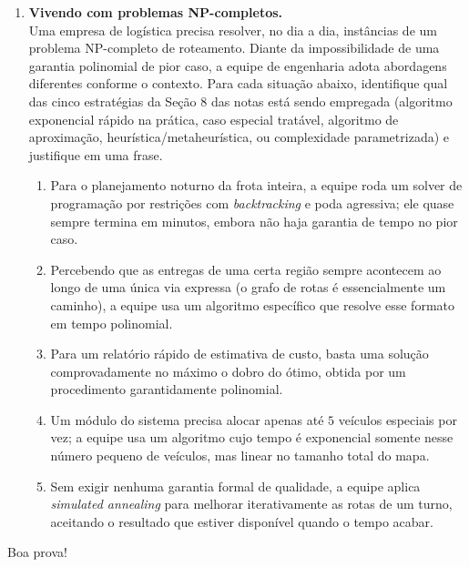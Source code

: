 \documentclass[10pt,a4paper]{extarticle}
\newcommand{\ntc}[1]{\textcolor{notice}{#1}}
\begin{document}
\begin{enumerate}[label=\textbf{\arabic*.}, itemsep=0.7cm, leftmargin=*]
\item \textbf{Vivendo com problemas NP-completos.} \\
Uma empresa de logística precisa resolver, no dia a dia, instâncias de um problema NP-completo de roteamento. Diante da impossibilidade de uma garantia polinomial de pior caso, a equipe de engenharia adota abordagens diferentes conforme o contexto. Para cada situação abaixo, identifique qual das cinco estratégias da Seção 8 das notas está sendo empregada (algoritmo exponencial rápido na prática, caso especial tratável, algoritmo de aproximação, heurística/metaheurística, ou complexidade parametrizada) e justifique em uma frase.

\begin{enumerate}[label=(\alph*)]
    \item Para o planejamento noturno da frota inteira, a equipe roda um solver de programação por restrições com \textit{backtracking} e poda agressiva; ele quase sempre termina em minutos, embora não haja garantia de tempo no pior caso.
    \item Percebendo que as entregas de uma certa região sempre acontecem ao longo de uma única via expressa (o grafo de rotas é essencialmente um caminho), a equipe usa um algoritmo específico que resolve esse formato em tempo polinomial.
    \item Para um relatório rápido de estimativa de custo, basta uma solução comprovadamente no máximo o dobro do ótimo, obtida por um procedimento garantidamente polinomial.
    \item Um módulo do sistema precisa alocar apenas até $5$ veículos especiais por vez; a equipe usa um algoritmo cujo tempo é exponencial somente nesse número pequeno de veículos, mas linear no tamanho total do mapa.
    \item Sem exigir nenhuma garantia formal de qualidade, a equipe aplica \textit{simulated annealing} para melhorar iterativamente as rotas de um turno, aceitando o resultado que estiver disponível quando o tempo acabar.
\end{enumerate}

\end{enumerate}

\vfill
\begin{center}
\small\ntc{Boa prova!}
\end{center}
\end{document}
